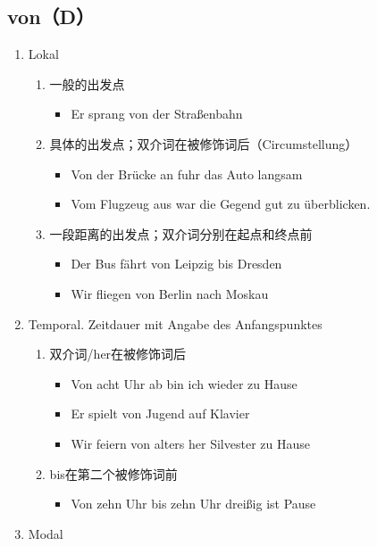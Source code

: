 \documentclass[UTF8]{report}
\begin{document}
\subsection{von（D）}
\begin{enumerate}
    \item Lokal
    \begin{enumerate}
        \item 一般的出发点
        \begin{itemize}
            \item Er sprang von der Straßenbahn
        \end{itemize}
        \item 具体的出发点；双介词在被修饰词后（Circumstellung）
        \begin{itemize}
            \item Von der Brücke an fuhr das Auto langsam
            \item Vom Flugzeug aus war die Gegend gut zu überblicken.
        \end{itemize}
        \item 一段距离的出发点；双介词分别在起点和终点前
        \begin{itemize}
            \item Der Bus fährt von Leipzig bis Dresden
            \item Wir fliegen von Berlin nach Moskau
        \end{itemize}
    \end{enumerate}
    \item Temporal. Zeitdauer mit Angabe des Anfangspunktes
    \begin{enumerate}
        \item 双介词/her在被修饰词后
        \begin{itemize}
            \item Von acht Uhr ab bin ich wieder zu Hause
            \item Er spielt von Jugend auf Klavier
            \item Wir feiern von alters her Silvester zu Hause
        \end{itemize}
        \item bis在第二个被修饰词前
        \begin{itemize}
            \item Von zehn Uhr bis zehn Uhr dreißig ist Pause
        \end{itemize}
    \end{enumerate}
    \item Modal

\end{enumerate}
\end{document}
